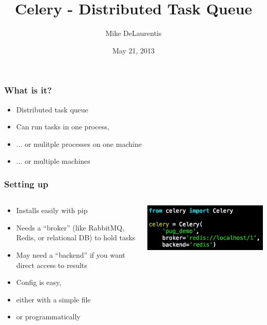 \documentclass{beamer}
\title{Celery - Distributed Task Queue}
\author{Mike DeLaurentis}
\date{May 21, 2013}
\begin{document}
\begin{frame}[plain]
\titlepage
\end{frame}

\begin{frame}
  \frametitle{What is it?}
  \begin{itemize}
  \item Distributed task queue
  \item Can run tasks in one process,
  \item ... or mulitple processes on one machine
  \item ... or multiple machines
  \end{itemize}
\end{frame}

\begin{frame}
  \frametitle{Setting up}
  \begin{columns}
    \begin{column}{0.5\textwidth}
      \begin{itemize}
      \item Installs easily with pip
      \item Needs a ``broker'' (like RabbitMQ, Redis, or relational DB) to hold tasks
      \item May need a ``backend'' if you want direct access to results
      \item Config is easy,
      \item either with a simple file
      \item or programmatically
      \end{itemize}      
    \end{column}

    \begin{column}{0.5\textwidth}

      \includegraphics[scale=0.4]{config.png}

    \end{column}
  \end{columns}
\end{frame}
\end{document}
